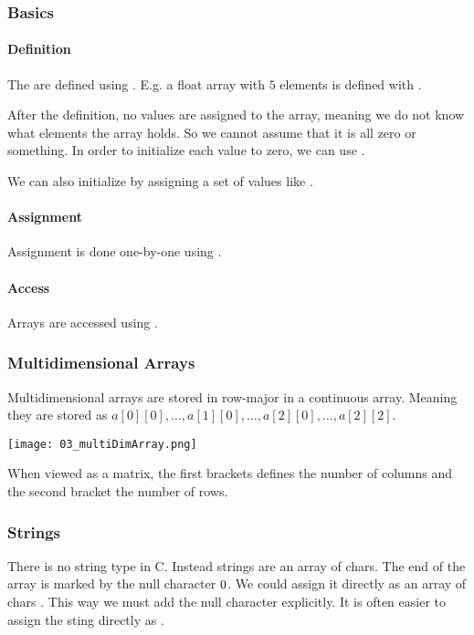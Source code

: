 \subsubsection{Basics}
\paragraph{Definition}
The are defined using . E.g. a float array with $5$ elements is defined with .

After the definition, no values are assigned to the array, meaning we do not know what elements the array holds. So we cannot assume that it is all zero or something. In order to initialize each value to zero, we can use .

We can also initialize by assigning a set of values like .

\paragraph{Assignment}
Assignment is done one-by-one using .

\paragraph{Access}
Arrays are accessed using .

\subsubsection{Multidimensional Arrays}
Multidimensional arrays are stored in row-major in a continuous array. Meaning they are stored as $a[0][0], \dots, a[1][0], \dots, a[2][0], \dots, a[2][2]$.

\texttt{[image: 03\_multiDimArray.png]}

When viewed as a matrix, the first brackets defines the number of columns and the second bracket the number of rows.

\subsubsection{Strings}
There is no string type in C. Instead strings are an array of chars. The end of the array is marked by the null character $\\0$. We could assign it directly as an array of chars . This way we must add the null character explicitly. It is often easier to assign the sting directly as .

